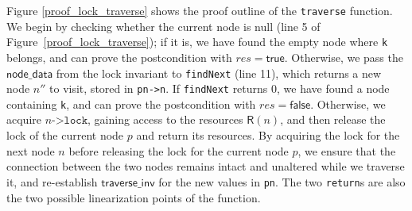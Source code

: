 \documentclass[a4paper,UKenglish,cleveref, autoref, thm-restate]{lipics-v2021}
\newcommand{\than}[1]{\textbf{\textcolor{blue}{[Than: #1]}}}
\begin{document}
Figure \ref{proof_lock_traverse} shows the proof outline of the \texttt{traverse} function.
We begin by checking whether the current node is null (line 5 of Figure~\ref{proof_lock_traverse}); if it is, we have found the empty node where \lstinline{k} belongs, and can prove the postcondition with $\mathit{res} = \mathsf{true}$. Otherwise, we pass the $\mathsf{node\_data}$ from the lock invariant to \lstinline{findNext} (line 11), which returns a new node $n''$ to visit, stored in \lstinline{pn->n}. If \lstinline{findNext} returns 0, we have found a node containing \lstinline{k}, and can prove the postcondition with $\mathit{res} = \mathsf{false}$. Otherwise, we acquire $n\texttt{->lock}$, gaining access to the resources $\mathsf{R}(n)$, and then release the lock of the current node $p$ and return its resources. %
By acquiring the lock for the next node $n$ before releasing the lock for the current node $p$, we ensure that the connection between the two nodes remains intact and unaltered while we traverse it, and re-establish $\mathsf{traverse\_inv}$ for the new values in \lstinline{pn}. 
The two \lstinline{return}s are also the two possible linearization points of the function.

%		 
%		 
%
\end{document}
